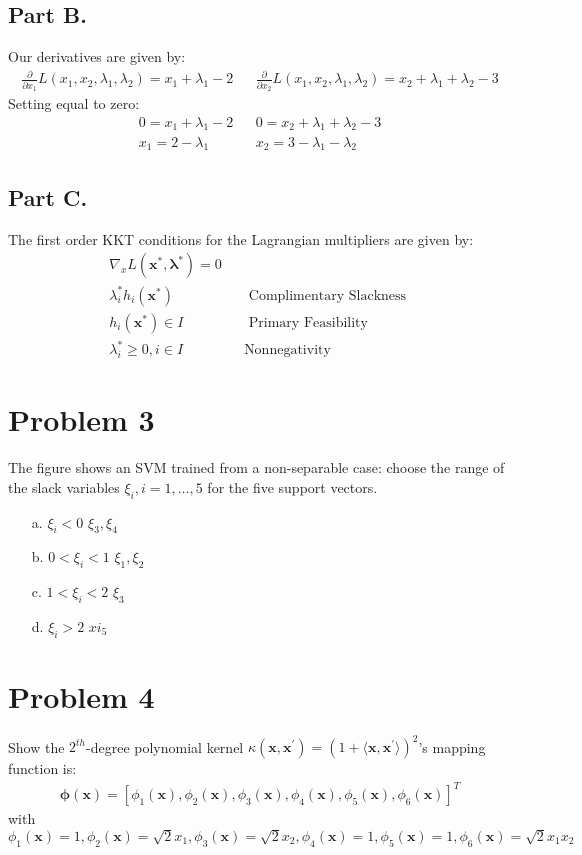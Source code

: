 \documentclass{article}
\begin{document}
\subsection*{Part B.}
Our derivatives are given by:
\begin{align*}
\frac{\partial}{\partial x_1} L(x_1, x_2, \lambda_1, \lambda_2) = x_1+\lambda_1-2 && \frac{\partial}{\partial x_2} L(x_1, x_2, \lambda_1, \lambda_2) = x_2+\lambda_1 + \lambda_2 -3
\end{align*}
Setting equal to zero:
\begin{align*}
0 = x_1+\lambda_1-2 && 0 = x_2+\lambda_1 + \lambda_2 -3 \\
\boxed{ x_1 = 2-\lambda_1 } && \boxed{ x_2 = 3 - \lambda_1 - \lambda_2 }
\end{align*}
\subsection*{Part C.}
The first order KKT conditions for the Lagrangian multipliers are given by:
\begin{align*}
\nabla_x L(\mathbf{x}^{*}, \mathbf{\lambda}^{*}) = 0\\
\lambda_i^{*} h_i(\mathbf{x^{*}}) && \text{ Complimentary Slackness }\\
h_i(\mathbf{x^{*}}) \in I && \text{ Primary Feasibility }\\ 
\lambda_i^{*} \geq 0, i\in I && \text{Nonnegativity}
\end{align*}


\clearpage
\section*{Problem 3}
The figure shows an SVM trained from a non-separable case: choose the range of the slack variables $\xi_i, i = 1,\dots,5$ for the five support vectors.
\begin{enumerate}
    \item[a.]
      $\xi_i < 0$ $\boxed{  \xi_3,  \xi_4 }$
    \item[b.]
      $0 < \xi_i < 1$ $\boxed{ \xi_1, \xi_2 }$
    \item[c.]
      $1 < \xi_i < 2$ $\boxed{ \xi_3} $
    \item[d.]
      $\xi_i > 2$ $\boxed{ xi_5 }$
\end{enumerate}


\clearpage


\section*{Problem 4}
    Show the $2^{th}$-degree polynomial kernel $\kappa(\textbf{x},\textbf{x}^\prime)= (1+\langle\textbf{x},\textbf{x}^\prime\rangle)^2$'s mapping function is:
    \begin{align*}
    \mathbf{\phi}(\mathbf{x}) = [\phi_1(\mathbf{x}), \phi_2(\mathbf{x}), \phi_3(\mathbf{x}), \phi_4(\mathbf{x}), \phi_5(\mathbf{x}), \phi_6(\mathbf{x})]^T
    \end{align*}
    with $\phi_1(\mathbf{x}) = 1,\phi_2(\mathbf{x}) = \sqrt{2}x_1,\phi_3(\mathbf{x}) = \sqrt{2}x_2,\phi_4(\mathbf{x}) = 1,\phi_5(\mathbf{x}) = 1,\phi_6(\mathbf{x}) = \sqrt{2}x_1x_2$
\end{document}
